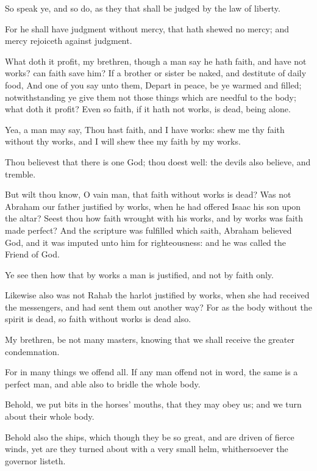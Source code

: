 \Verse So speak ye, and so do, as they that shall be judged by the law of liberty.

\Verse For he shall have judgment without mercy, that hath shewed no mercy; and mercy rejoiceth against judgment.

\Verse What doth it profit, my brethren, though a man say he hath faith, and have not works? can faith save him?  \Verse If a brother or sister be naked, and destitute of daily food, \Verse And one of you say unto them, Depart in peace, be ye warmed and filled; notwithstanding ye give them not those things which are needful to the body; what doth it profit?  \Verse Even so faith, if it hath not works, is dead, being alone.

\Verse Yea, a man may say, Thou hast faith, and I have works: shew me thy faith without thy works, and I will shew thee my faith by my works.

\Verse Thou believest that there is one God; thou doest well: the devils also believe, and tremble.

\Verse But wilt thou know, O vain man, that faith without works is dead?  \Verse Was not Abraham our father justified by works, when he had offered Isaac his son upon the altar?  \Verse Seest thou how faith wrought with his works, and by works was faith made perfect?  \Verse And the scripture was fulfilled which saith, Abraham believed God, and it was imputed unto him for righteousness: and he was called the Friend of God.

\Verse Ye see then how that by works a man is justified, and not by faith only.

\Verse Likewise also was not Rahab the harlot justified by works, when she had received the messengers, and had sent them out another way?  \Verse For as the body without the spirit is dead, so faith without works is dead also.


\Chapter
\Verse My brethren, be not many masters, knowing that we shall receive the greater condemnation.

\Verse For in many things we offend all. If any man offend not in word, the same is a perfect man, and able also to bridle the whole body.

\Verse Behold, we put bits in the horses' mouths, that they may obey us; and we turn about their whole body.

\Verse Behold also the ships, which though they be so great, and are driven of fierce winds, yet are they turned about with a very small helm, whithersoever the governor listeth.


